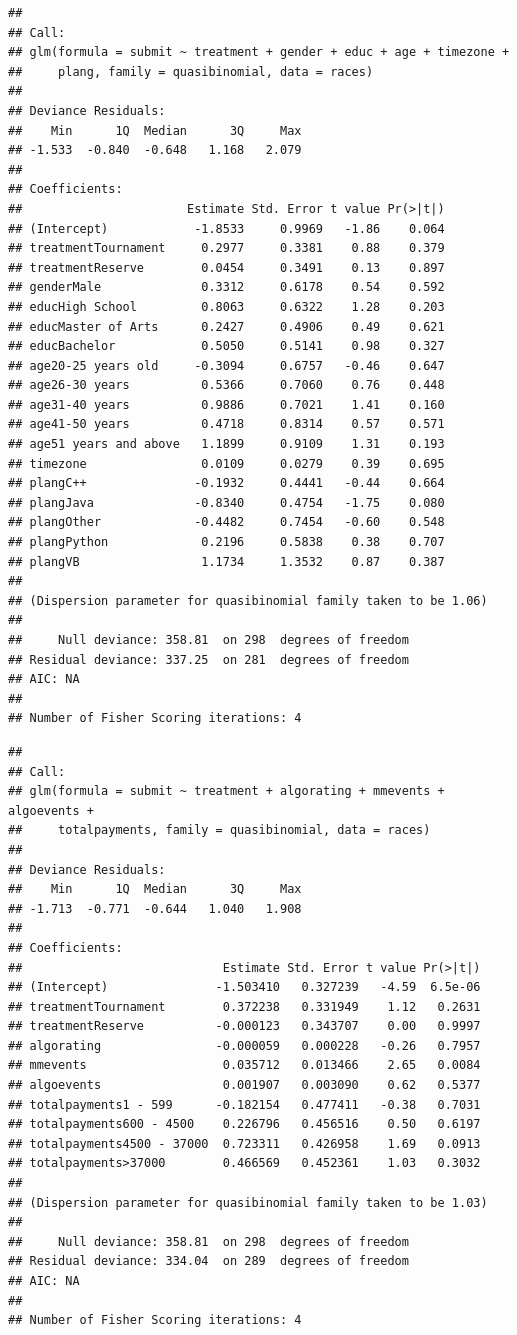 \documentclass[12pt,]{article}
\begin{document}
\begin{verbatim}
## 
## Call:
## glm(formula = submit ~ treatment + gender + educ + age + timezone + 
##     plang, family = quasibinomial, data = races)
## 
## Deviance Residuals: 
##    Min      1Q  Median      3Q     Max  
## -1.533  -0.840  -0.648   1.168   2.079  
## 
## Coefficients:
##                       Estimate Std. Error t value Pr(>|t|)
## (Intercept)            -1.8533     0.9969   -1.86    0.064
## treatmentTournament     0.2977     0.3381    0.88    0.379
## treatmentReserve        0.0454     0.3491    0.13    0.897
## genderMale              0.3312     0.6178    0.54    0.592
## educHigh School         0.8063     0.6322    1.28    0.203
## educMaster of Arts      0.2427     0.4906    0.49    0.621
## educBachelor            0.5050     0.5141    0.98    0.327
## age20-25 years old     -0.3094     0.6757   -0.46    0.647
## age26-30 years          0.5366     0.7060    0.76    0.448
## age31-40 years          0.9886     0.7021    1.41    0.160
## age41-50 years          0.4718     0.8314    0.57    0.571
## age51 years and above   1.1899     0.9109    1.31    0.193
## timezone                0.0109     0.0279    0.39    0.695
## plangC++               -0.1932     0.4441   -0.44    0.664
## plangJava              -0.8340     0.4754   -1.75    0.080
## plangOther             -0.4482     0.7454   -0.60    0.548
## plangPython             0.2196     0.5838    0.38    0.707
## plangVB                 1.1734     1.3532    0.87    0.387
## 
## (Dispersion parameter for quasibinomial family taken to be 1.06)
## 
##     Null deviance: 358.81  on 298  degrees of freedom
## Residual deviance: 337.25  on 281  degrees of freedom
## AIC: NA
## 
## Number of Fisher Scoring iterations: 4
\end{verbatim}

\begin{verbatim}
## 
## Call:
## glm(formula = submit ~ treatment + algorating + mmevents + algoevents + 
##     totalpayments, family = quasibinomial, data = races)
## 
## Deviance Residuals: 
##    Min      1Q  Median      3Q     Max  
## -1.713  -0.771  -0.644   1.040   1.908  
## 
## Coefficients:
##                            Estimate Std. Error t value Pr(>|t|)
## (Intercept)               -1.503410   0.327239   -4.59  6.5e-06
## treatmentTournament        0.372238   0.331949    1.12   0.2631
## treatmentReserve          -0.000123   0.343707    0.00   0.9997
## algorating                -0.000059   0.000228   -0.26   0.7957
## mmevents                   0.035712   0.013466    2.65   0.0084
## algoevents                 0.001907   0.003090    0.62   0.5377
## totalpayments1 - 599      -0.182154   0.477411   -0.38   0.7031
## totalpayments600 - 4500    0.226796   0.456516    0.50   0.6197
## totalpayments4500 - 37000  0.723311   0.426958    1.69   0.0913
## totalpayments>37000        0.466569   0.452361    1.03   0.3032
## 
## (Dispersion parameter for quasibinomial family taken to be 1.03)
## 
##     Null deviance: 358.81  on 298  degrees of freedom
## Residual deviance: 334.04  on 289  degrees of freedom
## AIC: NA
## 
## Number of Fisher Scoring iterations: 4
\end{verbatim}
\end{document}
